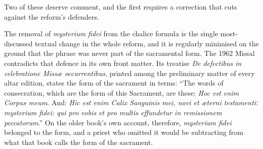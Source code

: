 Two of these deserve comment, and the first requires a correction that cuts against the reform's defenders.

The removal of \emph{mysterium fidei} from the chalice formula is the single most-discussed textual change in the whole reform, and it is regularly minimised on the ground that the phrase was never part of the sacramental form. The 1962 Missal contradicts that defence in its own front matter. Its treatise \emph{De defectibus in celebratione Missæ occurrentibus}, printed among the preliminary matter of every altar edition, states the form of the sacrament in terms: ``The words of consecration, which are the form of this Sacrament, are these: \emph{Hoc est enim Corpus meum}. And: \emph{Hic est enim Calix Sanguinis mei, novi et æterni testamenti: mysterium fidei: qui pro vobis et pro multis effundetur in remissionem peccatorum}.'' On the older book's own account, therefore, \emph{mysterium fidei} belonged to the form, and a priest who omitted it would be subtracting from what that book calls the form of the sacrament.

